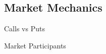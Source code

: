 \documentclass[10pt]{article}
\begin{document}
  \subsection{Market Mechanics}

    \begin{core}{Calls vs Puts}



    \end{core}

    \begin{core}{Market Participants}



    \end{core}
\end{document}
